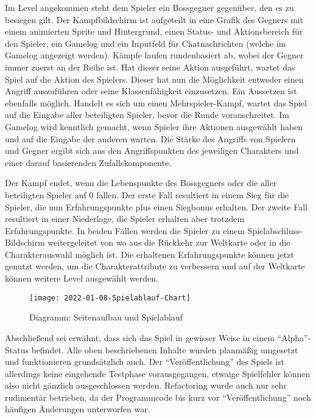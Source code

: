 Im Level angekommen steht dem Spieler ein Bossgegner gegenüber, den es zu besiegen gilt. Der Kampfbildschirm ist aufgeteilt in eine Grafik des Gegners mit einem animierten Sprite und Hintergrund, einen Status- und Aktionsbereich für den Spieler, ein Gamelog und ein Inputfeld für Chatnachrichten (welche im Gamelog angezeigt werden). Kämpfe laufen rundenbasiert ab, wobei der Gegner immer zuerst an der Reihe ist. Hat dieser seine Aktion ausgeführt, wartet das Spiel auf die Aktion des Spielers. Dieser hat nun die Möglichkeit entweder einen Angriff auszuführen oder seine Klassenfähigkeit einzusetzen. Ein Aussetzen ist ebenfalls möglich.
Handelt es sich um einen Mehrspieler-Kampf, wartet das Spiel auf die Eingabe aller beteiligten Spieler, bevor die Runde voranschreitet. Im Gamelog wird kenntlich gemacht, wenn Spieler ihre Aktionen ausgewählt haben und auf die Eingabe der anderen warten. 
Die Stärke des Angriffs von Spielern und Gegner ergibt sich aus den Angriffspunkten des jeweiligen Charakters und einer darauf basierenden Zufallskomponente.

Der Kampf endet, wenn die Lebenspunkte des Bossgegners oder die aller beteiligten Spieler auf 0 fallen. Der erste Fall resultiert in einem Sieg für die Spieler, die nun Erfahrungspunkte plus einen Siegbonus erhalten. Der zweite Fall resultiert in einer Niederlage, die Spieler erhalten aber trotzdem Erfahrungspunkte. In beiden Fällen werden die Spieler zu einem Spielabschluss-Bildschirm weitergeleitet von wo aus die Rückkehr zur Weltkarte oder in die Charakterauswahl möglich ist. Die erhaltenen Erfahrungspunkte können jetzt genutzt werden, um die Charakterattribute zu verbessern und auf der Weltkarte können weitere Level ausgewählt werden.

\begin{figure}[H]
    \centering
    \caption{Diagramm: Seitenaufbau und Spielablauf}
    \label{fig:2022-01-08-Spielablauf-Chart}
    \texttt{[image: 2022-01-08-Spielablauf-Chart]}
\end{figure}

Abschließend sei erwähnt, dass sich das Spiel in gewisser Weise in einem \enquote{Alpha}-Status befindet. Alle oben beschriebenen Inhalte wurden planmäßig umgesetzt und funktionieren grundsätzlich auch. Der \enquote{Veröffentlichung} des Spiels ist allerdings keine eingehende Testphase vorausgegangen, etwaige Spielfehler können also nicht gänzlich ausgeschlossen werden. Refactoring wurde auch nur sehr rudimentär betrieben, da der Programmcode bis kurz vor \enquote{Veröffentlichung} noch häufigen Änderungen unterworfen war.

